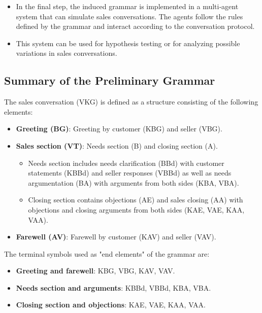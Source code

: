 \documentclass[
]{article}
\begin{document}
\begin{enumerate}
  \begin{itemize}
  \item
    In the final step, the induced grammar is implemented in a multi‑agent system that can simulate sales conversations. The agents follow the rules defined by the grammar and interact according to the conversation protocol.
  \item
    This system can be used for hypothesis testing or for analyzing possible variations in sales conversations.
  \end{itemize}
\end{enumerate}

\subsection{Summary of the Preliminary Grammar}\label{summary-of-the-preliminary-grammar}

The sales conversation (VKG) is defined as a structure consisting of the following elements:

\begin{itemize}
\item
  \textbf{Greeting (BG)}: Greeting by customer (KBG) and seller (VBG).
\item
  \textbf{Sales section (VT)}: Needs section (B) and closing section (A).

  \begin{itemize}
  \item
    Needs section includes needs clarification (BBd) with customer statements (KBBd) and seller responses (VBBd) as well as needs argumentation (BA) with arguments from both sides (KBA, VBA).
  \item
    Closing section contains objections (AE) and sales closing (AA) with objections and closing arguments from both sides (KAE, VAE, KAA, VAA).
  \end{itemize}
\item
  \textbf{Farewell (AV)}: Farewell by customer (KAV) and seller (VAV).
\end{itemize}

The terminal symbols used as "end elements" of the grammar are:

\begin{itemize}
\item
  \textbf{Greeting and farewell}: KBG, VBG, KAV, VAV.
\item
  \textbf{Needs section and arguments}: KBBd, VBBd, KBA, VBA.
\item
  \textbf{Closing section and objections}: KAE, VAE, KAA, VAA.
\end{itemize}
\end{document}
